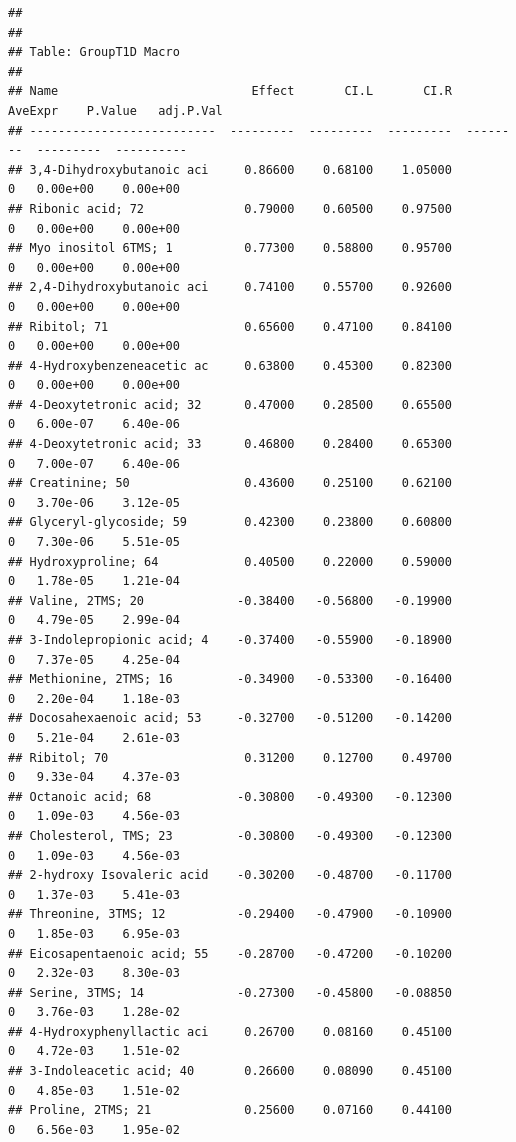 \documentclass[]{article}
\begin{document}
\begin{verbatim}
## 
## 
## Table: GroupT1D Macro
## 
## Name                           Effect       CI.L       CI.R   AveExpr    P.Value   adj.P.Val
## --------------------------  ---------  ---------  ---------  --------  ---------  ----------
## 3,4-Dihydroxybutanoic aci     0.86600    0.68100    1.05000         0   0.00e+00    0.00e+00
## Ribonic acid; 72              0.79000    0.60500    0.97500         0   0.00e+00    0.00e+00
## Myo inositol 6TMS; 1          0.77300    0.58800    0.95700         0   0.00e+00    0.00e+00
## 2,4-Dihydroxybutanoic aci     0.74100    0.55700    0.92600         0   0.00e+00    0.00e+00
## Ribitol; 71                   0.65600    0.47100    0.84100         0   0.00e+00    0.00e+00
## 4-Hydroxybenzeneacetic ac     0.63800    0.45300    0.82300         0   0.00e+00    0.00e+00
## 4-Deoxytetronic acid; 32      0.47000    0.28500    0.65500         0   6.00e-07    6.40e-06
## 4-Deoxytetronic acid; 33      0.46800    0.28400    0.65300         0   7.00e-07    6.40e-06
## Creatinine; 50                0.43600    0.25100    0.62100         0   3.70e-06    3.12e-05
## Glyceryl-glycoside; 59        0.42300    0.23800    0.60800         0   7.30e-06    5.51e-05
## Hydroxyproline; 64            0.40500    0.22000    0.59000         0   1.78e-05    1.21e-04
## Valine, 2TMS; 20             -0.38400   -0.56800   -0.19900         0   4.79e-05    2.99e-04
## 3-Indolepropionic acid; 4    -0.37400   -0.55900   -0.18900         0   7.37e-05    4.25e-04
## Methionine, 2TMS; 16         -0.34900   -0.53300   -0.16400         0   2.20e-04    1.18e-03
## Docosahexaenoic acid; 53     -0.32700   -0.51200   -0.14200         0   5.21e-04    2.61e-03
## Ribitol; 70                   0.31200    0.12700    0.49700         0   9.33e-04    4.37e-03
## Octanoic acid; 68            -0.30800   -0.49300   -0.12300         0   1.09e-03    4.56e-03
## Cholesterol, TMS; 23         -0.30800   -0.49300   -0.12300         0   1.09e-03    4.56e-03
## 2-hydroxy Isovaleric acid    -0.30200   -0.48700   -0.11700         0   1.37e-03    5.41e-03
## Threonine, 3TMS; 12          -0.29400   -0.47900   -0.10900         0   1.85e-03    6.95e-03
## Eicosapentaenoic acid; 55    -0.28700   -0.47200   -0.10200         0   2.32e-03    8.30e-03
## Serine, 3TMS; 14             -0.27300   -0.45800   -0.08850         0   3.76e-03    1.28e-02
## 4-Hydroxyphenyllactic aci     0.26700    0.08160    0.45100         0   4.72e-03    1.51e-02
## 3-Indoleacetic acid; 40       0.26600    0.08090    0.45100         0   4.85e-03    1.51e-02
## Proline, 2TMS; 21             0.25600    0.07160    0.44100         0   6.56e-03    1.95e-02

\end{verbatim}
\end{document}
